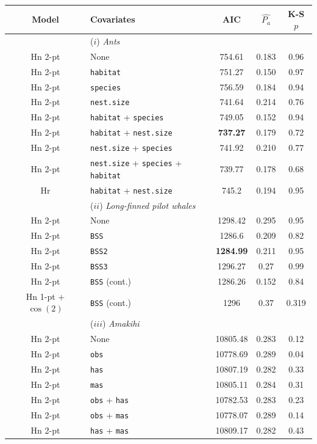\begin{table}
\centering
\begin{tabular}{c l c c c}
Model & Covariates & AIC & $\hat{P_a}$ & K-S $p$\\
\hline
 & ($i$) \textit{Ants} & & &  \\
Hn 2-pt & None & 754.61 & 0.183 & 0.96 \\
Hn 2-pt & \texttt{habitat} & 751.27 & 0.150 & 0.97 \\ 
Hn 2-pt & \texttt{species} & 756.59 & 0.184 & 0.94 \\  
Hn 2-pt & \texttt{nest.size} & 741.64 & 0.214 & 0.76 \\   
Hn 2-pt & \texttt{habitat} + \texttt{species} & 749.05 & 0.152 & 0.94\\ 
Hn 2-pt & \texttt{habitat} + \texttt{nest.size} & \textbf{737.27} & 0.179 & 0.72\\
Hn 2-pt & \texttt{nest.size} + \texttt{species} & 741.92 & 0.210 & 0.77\\
Hn 2-pt & \texttt{nest.size} + \texttt{species} + \texttt{habitat} & 739.77 & 0.178 & 0.68 \\
Hr & \texttt{habitat} + \texttt{nest.size} & 745.2 & 0.194 & 0.95\\
 & ($ii$) \textit{Long-finned pilot whales} & & & \\
Hn 2-pt & None & 1298.42 & 0.295 & 0.95 \\
Hn 2-pt & \texttt{BSS} & 1286.6 & 0.209 & 0.82 \\
Hn 2-pt & \texttt{BSS2} & \textbf{1284.99} & 0.211 &  0.95\\
Hn 2-pt & \texttt{BSS3} & 1296.27 & 0.27 & 0.99 \\
Hn 2-pt & \texttt{BSS} (cont.) &  1286.26 & 0.152 & 0.84\\
Hn 1-pt + $\cos(2)$& \texttt{BSS} (cont.) & 1296 & 0.37 & 0.319 \\
 & ($iii$) \textit{Amakihi} & & & \\
Hn 2-pt & None & 10805.48 & 0.283 & 0.12 \\
Hn 2-pt & \texttt{obs} & 10778.69 & 0.289 & 0.04\\
Hn 2-pt & \texttt{has} & 10807.19 &  0.282 & 0.33\\
Hn 2-pt & \texttt{mas} & 10805.11 &  0.284 & 0.31\\
Hn 2-pt & \texttt{obs} + \texttt{has} & 10782.53 & 0.283 &  0.23\\
Hn 2-pt & \texttt{obs} + \texttt{mas} & 10778.07 & 0.289 &  0.14\\
Hn 2-pt & \texttt{has} + \texttt{mas} & 10809.17 & 0.282 &  0.43 \\

\end{tabular}
\end{table}
